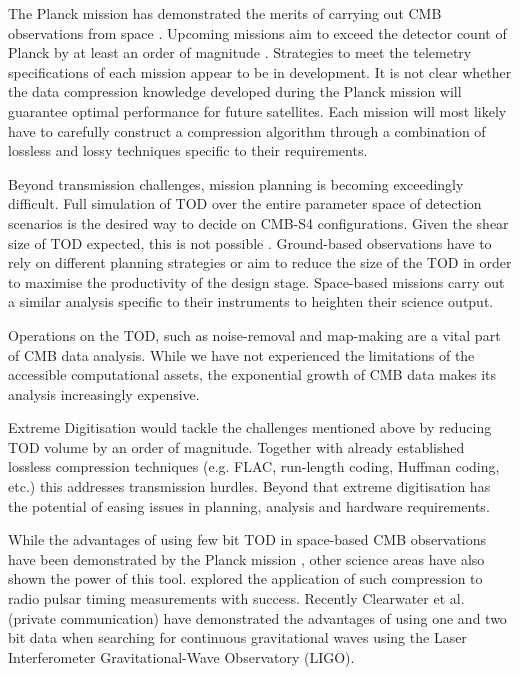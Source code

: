 \documentclass[apj]{emulateapj}
\begin{document}
The Planck mission has demonstrated the merits of carrying out CMB observations from space \citep{planck2018}. Upcoming missions aim to exceed the detector count of Planck by at least an order of magnitude \citep{litebird2014, pixie2011, core2018}. Strategies to meet the telemetry specifications of each mission appear to be in development. It is not clear whether the data compression knowledge developed during the Planck mission will guarantee optimal performance for future satellites. Each mission will most likely have to carefully construct a compression algorithm through a combination of lossless and lossy techniques specific to their requirements.


Beyond transmission challenges, mission planning is becoming exceedingly difficult. Full simulation of TOD over the entire parameter space of detection scenarios is the desired way to decide on CMB-S4 configurations. Given the shear size of TOD expected, this is not possible \citep{s4sciencebook}. Ground-based observations have to rely on different planning strategies or aim to reduce the size of the TOD in order to maximise the productivity of the design stage. Space-based missions carry out a similar analysis specific to their instruments to heighten their science output.


Operations on the TOD, such as noise-removal and map-making are a vital part of CMB data analysis. While we have not experienced the limitations of the accessible computational assets, the exponential growth of CMB data makes its analysis increasingly expensive.


Extreme Digitisation would tackle the challenges mentioned above by reducing TOD volume by an order of magnitude. Together with already established lossless compression techniques (e.g. FLAC, run-length coding, Huffman coding, etc.) this addresses transmission hurdles. Beyond that extreme digitisation has the potential of easing issues in planning, analysis and hardware requirements.


While the advantages of using few bit TOD in space-based CMB observations have been demonstrated by the Planck mission \citep{maris2003}, other science areas have also shown the power of this tool. \cite{jenet1998} explored the application of such compression to radio pulsar timing measurements with success. Recently Clearwater et al. (private communication) have demonstrated the advantages of using one and two bit data when searching for continuous gravitational waves using the Laser Interferometer Gravitational-Wave Observatory (LIGO).
\end{document}
